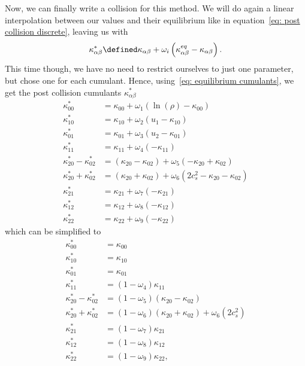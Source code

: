 
Now, we can finally write a collision for this method.
We will do again a linear interpolation between our values and their equilibrium like in equation~\eqref{eq: post collision discrete}, leaving us with
\begin{equation}
  \kappa_{\alpha\beta}^* \defined \kappa_{\alpha\beta} + \omega_i \left( \kappa_{\alpha\beta}^{eq} - \kappa_{\alpha\beta} \right).
\end{equation}
This time though, we have no need to restrict ourselves to just one parameter, but chose one for each cumulant.
Hence, using~\eqref{eq: equilibrium cumulants}, we get the post collision cumulants $\kappa_{\alpha\beta}^*$
\begin{equation}
  \label{eq: post equilibrium cumulants}
  \begin{aligned}
    \kappa_{00}^{*} & = \kappa_{00} + \omega_1 \left( \ln(\rho) - \kappa_{00} \right) \\
    \kappa_{10}^{*} & = \kappa_{10} + \omega_2 \left( u_1 - \kappa_{10} \right) \\
    \kappa_{01}^{*} & = \kappa_{01} + \omega_3 \left( u_2 - \kappa_{01} \right) \\
    \kappa_{11}^{*} & = \kappa_{11} + \omega_4 \left( - \kappa_{11} \right) \\
    \kappa_{20}^{*} - \kappa_{02}^{*}
      & = (\kappa_{20} - \kappa_{02}) + \omega_5 \left( - \kappa_{20} + \kappa_{02} \right) \\
    \kappa_{20}^{*} + \kappa_{02}^{*}
      & = (\kappa_{20} + \kappa_{02}) + \omega_6 \left( 2 c_s^2 - \kappa_{20} - \kappa_{02} \right) \\
    \kappa_{21}^{*} & = \kappa_{21} + \omega_7 \left( - \kappa_{21} \right) \\
    \kappa_{12}^{*} & = \kappa_{12} + \omega_8 \left( - \kappa_{12} \right) \\
    \kappa_{22}^{*} & = \kappa_{22} + \omega_9 \left( - \kappa_{22} \right)
  \end{aligned}
\end{equation}
which can be simplified to
\begin{equation}
  \label{eq: collision final before simplification}
  \begin{aligned}
    \kappa_{00}^{*} & = \kappa_{00} \\
    \kappa_{10}^{*} & = \kappa_{10} \\
    \kappa_{01}^{*} & = \kappa_{01} \\
    \kappa_{11}^{*} & = (1-\omega_4)\kappa_{11} \\
    \kappa_{20}^{*} - \kappa_{02}^{*}
      & = (1-\omega_5) (\kappa_{20} - \kappa_{02}) \\
    \kappa_{20}^{*} + \kappa_{02}^{*}
      & = (1-\omega_6)(\kappa_{20} + \kappa_{02}) + \omega_6 \left( 2 c_s^2 \right) \\
    \kappa_{21}^{*} & = (1-\omega_7)\kappa_{21} \\
    \kappa_{12}^{*} & = (1-\omega_8)\kappa_{12} \\
    \kappa_{22}^{*} & = (1-\omega_9)\kappa_{22},
  \end{aligned}
\end{equation}
